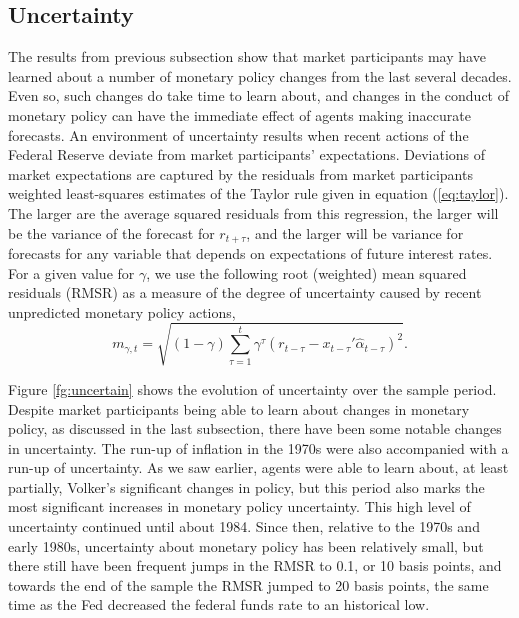 \documentclass[12pt]{article}
\newcommand{\beq}{\begin{equation}}
\newcommand{\eeq}{\end{equation}}
\newcommand{\ds}{\displaystyle}
\begin{document}
\subsection{Uncertainty}
The results from previous subsection show that market participants may have learned about a number of monetary policy changes from the last several decades.  Even so, such changes do take time to learn about, and changes in the conduct of monetary policy can have the immediate effect of agents making inaccurate forecasts.  An environment of uncertainty results when recent actions of the Federal Reserve deviate from market participants' expectations.  Deviations of market expectations are captured by the residuals from market participants weighted least-squares estimates of the Taylor rule given in equation (\ref{eq:taylor}).  The larger are the average squared residuals from this regression, the larger will be the variance of the forecast for $r_{t+\tau}$, and the larger will be variance for forecasts for any variable that depends on expectations of future interest rates.  For a given value for $\gamma$, we use the following root (weighted) mean squared residuals  (RMSR) as a measure of the degree of uncertainty caused by recent unpredicted monetary policy actions,
\beq m_{\gamma,t} = \sqrt{ (1-\gamma) \ds \sum_{\tau=1}^{t} \gamma^{\tau} (r_{t-\tau} - x_{t-\tau}'\hat{\alpha}_{t-\tau} )^2}. \eeq  
 
Figure \ref{fg:uncertain} shows the evolution of uncertainty over the sample period.  Despite market participants being able to learn about changes in monetary policy, as discussed in the last subsection, there have been some notable changes in uncertainty.  The run-up of inflation in the 1970s were also accompanied with a run-up of uncertainty.  As we saw earlier, agents were able to learn about, at least partially, Volker's significant changes in policy, but this period also marks the most significant increases in monetary policy uncertainty.  This high level of uncertainty continued until about 1984.  Since then, relative to the 1970s and early 1980s, uncertainty about monetary policy has been relatively small, but there still have been frequent jumps in the RMSR to 0.1, or 10 basis points, and towards the end of the sample the RMSR jumped to 20 basis points, the same time as the Fed decreased the federal funds rate to an historical low.
 
\end{document}
